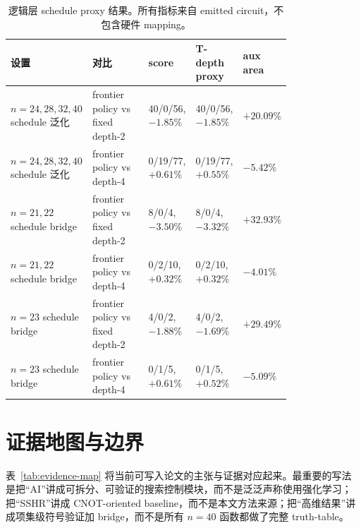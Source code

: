 \documentclass[UTF8,fontset=macnew,11pt]{ctexart}
\newcommand{\ttable}{truth-table}
\begin{document}
\begin{table}[H]
\centering
\tiny
\caption{逻辑层 schedule proxy 结果。所有指标来自 emitted circuit，不包含硬件 mapping。}
\label{tab:schedule}
\begin{tabular}{@{}p{0.20\linewidth}p{0.20\linewidth}p{0.14\linewidth}p{0.15\linewidth}p{0.10\linewidth}@{}}
\toprule
设置 & 对比 & score & T-depth proxy & aux area \\
\midrule
$n=24,28,32,40$ schedule 泛化 & frontier policy vs fixed depth-2 & 40/0/56, $-1.85\%$ & 40/0/56, $-1.85\%$ & $+20.09\%$ \\
$n=24,28,32,40$ schedule 泛化 & frontier policy vs depth-4 & 0/19/77, $+0.61\%$ & 0/19/77, $+0.55\%$ & $-5.42\%$ \\
$n=21,22$ schedule bridge & frontier policy vs fixed depth-2 & 8/0/4, $-3.50\%$ & 8/0/4, $-3.32\%$ & $+32.93\%$ \\
$n=21,22$ schedule bridge & frontier policy vs depth-4 & 0/2/10, $+0.32\%$ & 0/2/10, $+0.32\%$ & $-4.01\%$ \\
$n=23$ schedule bridge & frontier policy vs fixed depth-2 & 4/0/2, $-1.88\%$ & 4/0/2, $-1.69\%$ & $+29.49\%$ \\
$n=23$ schedule bridge & frontier policy vs depth-4 & 0/1/5, $+0.61\%$ & 0/1/5, $+0.52\%$ & $-5.09\%$ \\
\bottomrule
\end{tabular}
\end{table}

\section{证据地图与边界}

表~\ref{tab:evidence-map} 将当前可写入论文的主张与证据对应起来。最重要的写法是把“AI”讲成可拆分、可验证的搜索控制模块，而不是泛泛声称使用强化学习；把“SSHR”讲成 CNOT-oriented baseline，而不是本文方法来源；把“高维结果”讲成项集级符号验证加 bridge，而不是所有 $n=40$ 函数都做了完整 \ttable{}。
\end{document}
